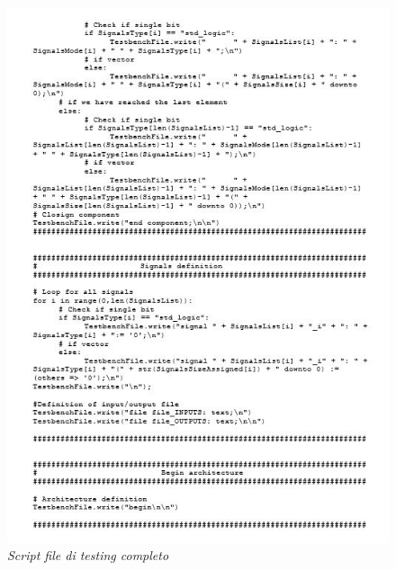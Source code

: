 \begin{figure}[!htb]
	\centering
	\includegraphics[scale=1]{immagini/tbgen4}
	\caption{\textit{Script file di testing completo}}
	\label{tbgen4}
\end{figure}
